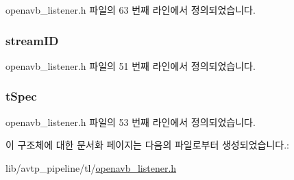 openavb\+\_\+listener.\+h 파일의 63 번째 라인에서 정의되었습니다.

\subsubsection[{\texorpdfstring{stream\+ID}{streamID}}]{ stream\+ID}\hypertarget{structlistener__data__t_a989c1ccd88811e9926203a07d587bc21}{}\label{structlistener__data__t_a989c1ccd88811e9926203a07d587bc21}


openavb\+\_\+listener.\+h 파일의 51 번째 라인에서 정의되었습니다.

\subsubsection[{\texorpdfstring{t\+Spec}{tSpec}}]{ t\+Spec}\hypertarget{structlistener__data__t_ab928eca0e7b010a8cc3a80be5bc8adcc}{}\label{structlistener__data__t_ab928eca0e7b010a8cc3a80be5bc8adcc}


openavb\+\_\+listener.\+h 파일의 53 번째 라인에서 정의되었습니다.



이 구조체에 대한 문서화 페이지는 다음의 파일로부터 생성되었습니다.\+:\begin{DoxyCompactItemize}
\item 
lib/avtp\+\_\+pipeline/tl/\hyperlink{openavb__listener_8h}{openavb\+\_\+listener.\+h}\end{DoxyCompactItemize}
